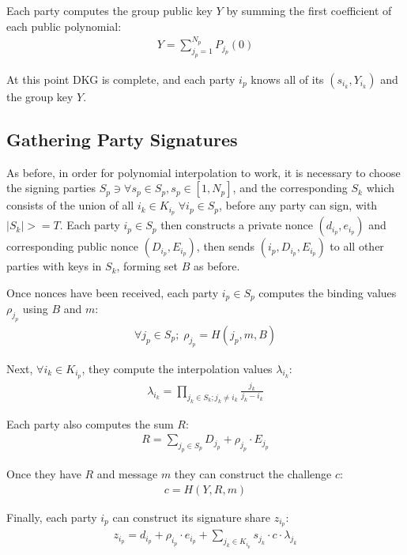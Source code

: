 \documentclass{article}
\begin{document}
Each party computes the group public key $Y$ by summing the first coefficient of each public polynomial:
\begin{align}
  Y = \sum_{j_p=1}^{N_p} P_{j_p}(0)
\end{align}

At this point DKG is complete, and each party $i_p$ knows all of its $(s_{i_k}, Y_{i_k})$ and the group key $Y$.

\subsection{
  Gathering Party Signatures
}

As before, in order for polynomial interpolation to work, it is necessary to choose the signing parties $S_p \ni \forall s_p \in S_p, s_p \in [1, N_p]$, and the corresponding $S_k$ which consists of the union of all $i_k \in K_{i_p}\; \forall i_p \in S_p$, before any party can sign, with $|S_k| >= T$.  Each party $i_p \in S_p$ then constructs a private nonce $(d_{i_p},e_{i_p})$ and corresponding public nonce $(D_{i_p},E_{i_p})$, then sends $(i_p, D_{i_p},E_{i_p})$ to all other parties with keys in $S_k$, forming set $B$ as before.

Once nonces have been received, each party $i_p \in S_p$ computes the binding values $\rho_{j_p}$ using $B$ and $m$:
\begin{align}
  \forall j_p \in S_p;\;\rho_{j_p} = H(j_p, m, B)
\end{align}

Next, $\forall i_k \in K_{i_p}$,  they compute the interpolation values $\lambda_{i_k}$:
\begin{align}
  \lambda_{i_k} = \prod_{j_k \in S_k; j_k \neq i_k}^{} \frac{j_k}{j_k - i_k}
\end{align}

Each party also computes the sum $R$:
\begin{align}
  R = \sum_{j_p \in S_p}^{} D_{j_p} + \rho_{j_p} \cdot E_{j_p}
\end{align}

Once they have $R$ and message $m$ they can construct the challenge $c$:
\begin{align}
  c = H(Y, R, m)
\end{align}

Finally, each party $i_p$ can construct its signature share $z_{i_p}$:
\begin{align}
  z_{i_p} = d_{i_p} + \rho_{i_p} \cdot e_{i_p} + \sum_{j_k \in K_{i_p}}^{} s_{j_k} \cdot c \cdot \lambda_{j_k}
\end{align}
\end{document}
